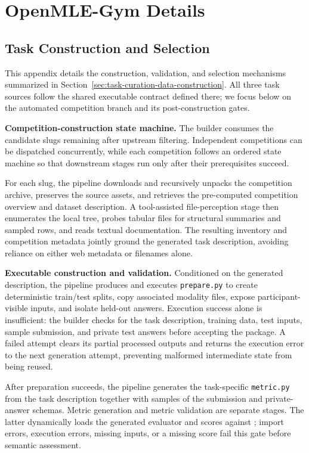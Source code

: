 \newpage
\section{OpenMLE-Gym Details}

\subsection{Task Construction and Selection}
\label{app:data-construction}

This appendix details the construction, validation, and selection mechanisms summarized in Section~\ref{sec:task-curation-data-construction}. All three task sources follow the shared executable contract defined there; we focus below on the automated competition branch and its post-construction gates.

\textbf{Competition-construction state machine.}
The builder consumes the candidate slugs remaining after upstream filtering. Independent competitions can be dispatched concurrently, while each competition follows an ordered state machine so that downstream stages run only after their prerequisites succeed.

For each slug, the pipeline downloads and recursively unpacks the competition archive, preserves the source assets, and retrieves the pre-computed competition overview and dataset description. A tool-assisted file-perception stage then enumerates the local tree, probes tabular files for structural summaries and sampled rows, and reads textual documentation. The resulting inventory and competition metadata jointly ground the generated task description, avoiding reliance on either web metadata or filenames alone.

\textbf{Executable construction and validation.}
Conditioned on the generated description, the pipeline produces and executes \texttt{prepare.py} to create deterministic train/test splits, copy associated modality files, expose participant-visible inputs, and isolate held-out answers. Execution success alone is insufficient: the builder checks for the task description, training data, test inputs, sample submission, and private test answers before accepting the package. A failed attempt clears its partial processed outputs and returns the execution error to the next generation attempt, preventing malformed intermediate state from being reused.

After preparation succeeds, the pipeline generates the task-specific \texttt{metric.py} from the task description together with samples of the submission and private-answer schemas. Metric generation and metric validation are separate stages. The latter dynamically loads the generated evaluator and scores  against ; import errors, execution errors, missing inputs, or a missing score fail this gate before semantic assessment.


